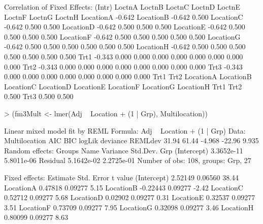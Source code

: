 \documentclass[12pt]{article}
\begin{document}
\begin{Schunk}
\begin{Soutput}
Correlation of Fixed Effects:
          (Intr) LoctnA LoctnB LoctnC LoctnD LoctnE LoctnF LoctnG LoctnH
LocationA -0.642                                                        
LocationB -0.642  0.500                                                 
LocationC -0.642  0.500  0.500                                          
LocationD -0.642  0.500  0.500  0.500                                   
LocationE -0.642  0.500  0.500  0.500  0.500                            
LocationF -0.642  0.500  0.500  0.500  0.500  0.500                     
LocationG -0.642  0.500  0.500  0.500  0.500  0.500  0.500              
LocationH -0.642  0.500  0.500  0.500  0.500  0.500  0.500  0.500       
Trt1      -0.343  0.000  0.000  0.000  0.000  0.000  0.000  0.000  0.000
Trt2      -0.343  0.000  0.000  0.000  0.000  0.000  0.000  0.000  0.000
Trt3      -0.343  0.000  0.000  0.000  0.000  0.000  0.000  0.000  0.000
          Trt1   Trt2  
LocationA              
LocationB              
LocationC              
LocationD              
LocationE              
LocationF              
LocationG              
LocationH              
Trt1                   
Trt2       0.500       
Trt3       0.500  0.500
\end{Soutput}
\begin{Sinput}
> (fm3Mult <- lmer(Adj ~ Location + (1 | Grp), Multilocation))
\end{Sinput}
\begin{Soutput}
Linear mixed model fit by REML 
Formula: Adj ~ Location + (1 | Grp) 
   Data: Multilocation 
   AIC   BIC logLik deviance REMLdev
 31.94 61.44 -4.968   -22.96   9.935
Random effects:
 Groups   Name        Variance   Std.Dev.  
 Grp      (Intercept) 3.3652e-11 5.8011e-06
 Residual             5.1642e-02 2.2725e-01
Number of obs: 108, groups: Grp, 27

Fixed effects:
            Estimate Std. Error t value
(Intercept)  2.52149    0.06560   38.44
LocationA    0.47818    0.09277    5.15
LocationB   -0.22443    0.09277   -2.42
LocationC    0.52712    0.09277    5.68
LocationD    0.02902    0.09277    0.31
LocationE    0.32537    0.09277    3.51
LocationF    0.73709    0.09277    7.95
LocationG    0.32098    0.09277    3.46
LocationH    0.80099    0.09277    8.63


\end{Soutput}
\end{Schunk}
\end{document}
